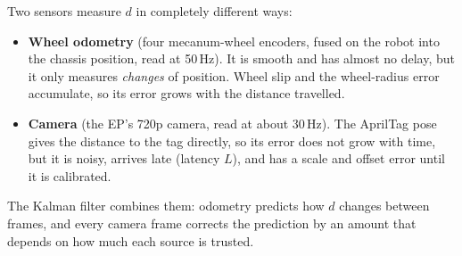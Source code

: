\documentclass[11pt,a4paper]{article}
\begin{document}
Two sensors measure $d$ in completely different ways:
\begin{itemize}
\item \textbf{Wheel odometry} (four mecanum-wheel encoders, fused on the robot into the chassis position, read at 50\,Hz). It is smooth and has almost no delay, but it only measures \emph{changes} of position. Wheel slip and the wheel-radius error accumulate, so its error grows with the distance travelled.
\item \textbf{Camera} (the EP's 720p camera, read at about 30\,Hz). The AprilTag pose gives the distance to the tag directly, so its error does not grow with time, but it is noisy, arrives late (latency $L$), and has a scale and offset error until it is calibrated.
\end{itemize}
The Kalman filter combines them: odometry predicts how $d$ changes between frames, and every camera frame corrects the prediction by an amount that depends on how much each source is trusted.
\end{document}
